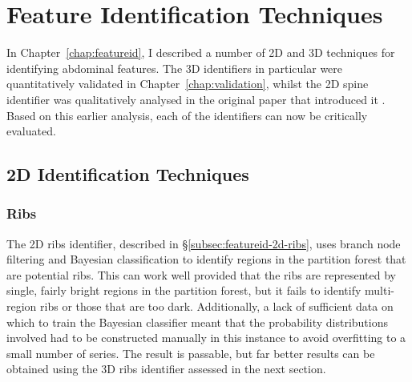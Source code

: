 \section{Feature Identification Techniques}

In Chapter~\ref{chap:featureid}, I described a number of 2D and 3D techniques for identifying abdominal features. The 3D identifiers in particular were quantitatively validated in Chapter~\ref{chap:validation}, whilst the 2D spine identifier was qualitatively analysed in the original paper that introduced it \cite{gvcispa09}. Based on this earlier analysis, each of the identifiers can now be critically evaluated.

\subsection{2D Identification Techniques}

\subsubsection{Ribs}

The 2D ribs identifier, described in \S\ref{subsec:featureid-2d-ribs}, uses branch node filtering and Bayesian classification to identify regions in the partition forest that are potential ribs. This can work well provided that the ribs are represented by single, fairly bright regions in the partition forest, but it fails to identify multi-region ribs or those that are too dark. Additionally, a lack of sufficient data on which to train the Bayesian classifier meant that the probability distributions involved had to be constructed manually in this instance to avoid overfitting to a small number of series. The result is passable, but far better results can be obtained using the 3D ribs identifier assessed in the next section.

